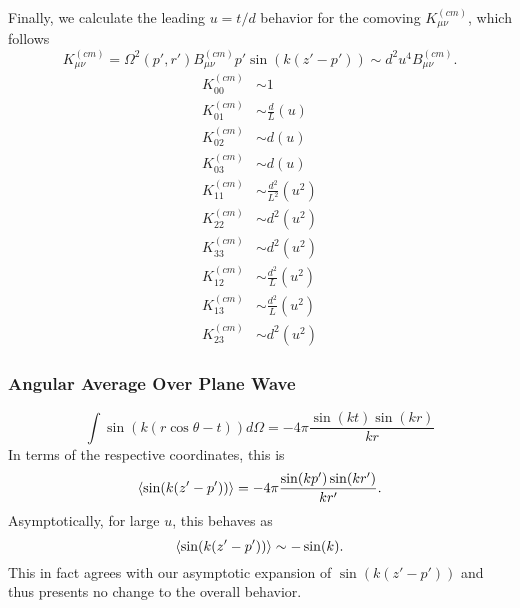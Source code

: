 \documentclass[10pt,letterpaper]{article}
\begin{document}
Finally, we calculate the leading $u= t/d$ behavior for the comoving $K_{\mu\nu}^{(cm)}$, which follows
\begin{equation}
K^{(cm)}_{\mu\nu} = \Omega^2(p',r')  B_{\mu\nu}^{(cm)} p' \sin(k(z'-p')) \sim d^2 u^4 B_{\mu\nu}^{(cm)}.
\end{equation}
\begin{align}
K^{(cm)}_{00} &\sim 1 \nonumber\\
K^{(cm)}_{01} &\sim \frac{d}{L}(u) \nonumber\\
K^{(cm)}_{02} &\sim d (u) \nonumber\\
K^{(cm)}_{03} &\sim d (u) \nonumber\\
K^{(cm)}_{11} &\sim \frac{d^2}{L^2}(u^2) \nonumber\\
K^{(cm)}_{22} &\sim d^2(u^2) \nonumber\\
K^{(cm)}_{33} &\sim d^2(u^2) \nonumber\\
K^{(cm)}_{12} &\sim \frac{d^2}{L}(u^2) \nonumber\\
K^{(cm)}_{13} &\sim \frac{d^2}{L}(u^2) \nonumber\\
K^{(cm)}_{23} &\sim d^2(u^2)
\end{align}
\subsubsection*{Angular Average Over Plane Wave}
\begin{equation}
\int \sin(k(r\cos\theta-t))d\Omega = -4\pi \frac{\sin(kt)\sin(kr)}{kr} 
\end{equation}
In terms of the respective coordinates, this is
\begin{equation}
\braket{\sin(k(z'-p'))} = -4\pi \frac{\sin(kp')\sin(kr')}{kr'}.
\end{equation}
Asymptotically, for large $u$, this behaves as
\begin{equation}
\braket{\sin(k(z'-p'))} \sim -\sin(k).
\end{equation}
This in fact agrees with our asymptotic expansion of $\sin(k(z'-p'))$ and thus presents no change to the overall behavior.
\end{document}
